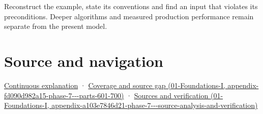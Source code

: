 Reconstruct the example, state its conventions and find an input that violates its preconditions. Deeper algorithms and measured production performance remain separate from the present model.

\section{Source and navigation}\label{appendix-175ca5ff874d-source-and-navigation}

\href{Continuous\%20Notes/Computing\%20Foundations\%20-\%20From\%20Bits\%20to\%20C++\%20and\%20Systems\%20APIs\#Keep\%20the\%20promises\%20visible\%20while\%20moving\%20between\%20representations}{Continuous explanation} · \href{../01-Foundations-I/main.pdf\#nameddest=appendix-fd090d982a15-phase-7---parts-601-700}{Coverage and source gap (01-Foundations-I, appendix-fd090d982a15-phase-7-\/-\/-parts-601-700)} · \href{../01-Foundations-I/main.pdf\#nameddest=appendix-a103e7846d21-phase-7---source-analysis-and-verification}{Sources and verification (01-Foundations-I, appendix-a103e7846d21-phase-7-\/-\/-source-analysis-and-verification)}
